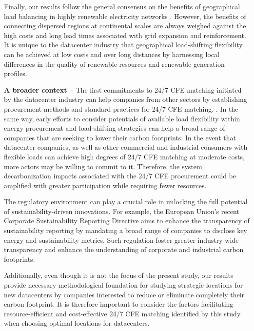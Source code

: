 Finally, our results follow the general consensus on the benefits of geographical load balancing in highly renewable electricity networks \cite{schlachtbergerBenefitsCooperationHighly2017}.
However, the benefits of connecting dispersed regions at continental scales are always weighed against the high costs and long lead times associated with grid expansion and reinforcement.
It is unique to the datacenter industry that geographical load-shifting flexibility can be achieved at low costs and over long distances by harnessing local differences in the quality of renewable resources and renewable generation profiles.

\textbf{A broader context --} The first commitments to 24/7 CFE matching initiated by the datacenter industry can help companies from other sectors by establishing procurement methods and standard practices for 24/7 CFE matching. \cite{xu-247CFE-report}.
In the same way, early efforts to consider potentials of available load flexibility within energy procurement and load-shifting strategies can help a broad range of companies that are seeking to lower their carbon footprints.
In the event that datacenter companies, as well as other commercial and industrial consumers with flexible loads can achieve high degrees of 24/7 CFE matching at moderate costs, more actors may be willing to commit to it.
Therefore, the system decarbonization impacts associated with the 24/7 CFE procurement \cite{riepinMeansCostsSystemlevel2023} could be amplified with greater participation while requiring fewer resources.

The regulatory environment can play a crucial role in unlocking the full potential of sustainability-driven innovations.
For example, the European Union's recent Corporate Sustainability Reporting Directive \cite{DirectiveEU20222022} aims to enhance the transparency of sustainability reporting by mandating a broad range of companies to disclose key energy and sustainability metrics.
Such regulation foster greater industry-wide transparency and enhance the understanding of corporate and industrial carbon footprints.

Additionally, even though it is not the focus of the present study, our results provide necessary methodological foundation for studying strategic locations for new datacenters by companies interested to reduce or eliminate completely their carbon footprint. It is therefore important to consider the factors facilitating resource-efficient and cost-effective 24/7 CFE matching identified by this study when choosing optimal locations for datacenters.

